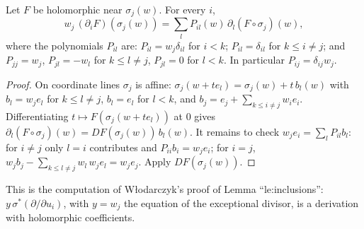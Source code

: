 \begin{lemma}
\label{mc:monomial-derivation}
\leanok
Let \(F\) be holomorphic near \(\sigma_j(w)\). For every \(i\),
\[
 w_j\,(\partial_iF)(\sigma_j(w))=\sum_lP_{il}(w)\,\partial_l(F\circ\sigma_j)(w),
\]
where the polynomials \(P_{il}\) are: \(P_{il}=w_j\delta_{il}\) for \(i<k\); \(P_{il}=\delta_{il}\) for \(k\le i\ne j\); and \(P_{jj}=w_j\),
\(P_{jl}=-w_l\) for \(k\le l\ne j\), \(P_{jl}=0\) for \(l<k\). In particular \(P_{ij}=\delta_{ij}w_j\).
\end{lemma}
\begin{proof}
\leanok
On coordinate lines \(\sigma_j\) is affine: \(\sigma_j(w+te_l)=\sigma_j(w)+t\,b_l(w)\) with \(b_l=w_je_l\) for \(k\le l\ne j\), \(b_l=e_l\) for \(l<k\), and
\(b_j=e_j+\sum_{k\le i\ne j}w_ie_i\). Differentiating \(t\mapsto F(\sigma_j(w+te_l))\) at \(0\) gives \(\partial_l(F\circ\sigma_j)(w)=DF(\sigma_j(w))\,b_l(w)\). It
remains to check \(w_je_i=\sum_lP_{il}b_l\): for \(i\ne j\) only \(l=i\) contributes and \(P_{ii}b_i=w_je_i\); for \(i=j\),
\(w_jb_j-\sum_{k\le l\ne j}w_l\,w_je_l=w_je_j\). Apply \(DF(\sigma_j(w))\).
\end{proof}
This is the computation of Włodarczyk's proof of Lemma ``le:inclusions'': \(y\,\sigma^*(\partial/\partial u_i)\), with \(y=w_j\) the equation of the
exceptional divisor, is a derivation with holomorphic coefficients.

